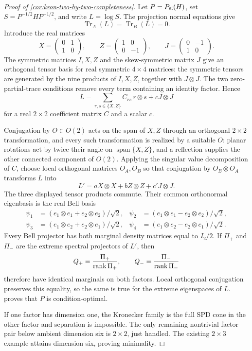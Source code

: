 \begin{proof}[Proof of \cref{cor:kron-two-by-two-completeness}]
Let \(P=P_{\mathcal K}(H)\), set \(S=P^{-1/2}HP^{-1/2}\), and write
\(L=\log S\).  The projection normal equations give
\[
  \operatorname{Tr}_A(L)=\operatorname{Tr}_B(L)=0.
\]
Introduce the real matrices
\[
  X=\begin{pmatrix}0&1\\1&0\end{pmatrix},
  \qquad
  Z=\begin{pmatrix}1&0\\0&-1\end{pmatrix},
  \qquad
  J=\begin{pmatrix}0&-1\\1&0\end{pmatrix}.
\]
The symmetric matrices \(I,X,Z\) and the skew-symmetric matrix \(J\) give an
orthogonal tensor basis for real symmetric \(4\times4\) matrices: the symmetric
tensors are generated by the nine products of \(I,X,Z\), together with
\(J\otimes J\).  The two zero-partial-trace conditions remove every term
containing an identity factor.  Hence
\[
  L
  =
  \sum_{r,s\in\{X,Z\}}C_{rs}\,r\otimes s+cJ\otimes J
\]
for a real \(2\times2\) coefficient matrix \(C\) and a scalar \(c\).

Conjugation by \(O\in O(2)\) acts on the span of \(X,Z\) through an
orthogonal \(2\times2\) transformation, and every such transformation is
realized by a suitable \(O\): planar rotations act by twice their angle on
\(\operatorname{span}\{X,Z\}\), and a reflection supplies the other connected
component of \(O(2)\).  Applying the singular value decomposition of
\(C\), choose local orthogonal matrices \(O_A,O_B\) so that conjugation by
\(O_B\otimes O_A\) transforms \(L\) into
\[
  L'=aX\otimes X+bZ\otimes Z+c'J\otimes J.
\]
The three displayed tensor products commute.  Their common orthonormal
eigenbasis is the real Bell basis
\[
\begin{aligned}
  \psi_1&=(e_1\otimes e_1+e_2\otimes e_2)/\sqrt2,&
  \psi_2&=(e_1\otimes e_1-e_2\otimes e_2)/\sqrt2,\\
  \psi_3&=(e_1\otimes e_2+e_2\otimes e_1)/\sqrt2,&
  \psi_4&=(e_1\otimes e_2-e_2\otimes e_1)/\sqrt2.
\end{aligned}
\]
Every Bell projector has both marginal density matrices equal to \(I_2/2\).
If \(\Pi_+\) and \(\Pi_-\) are the extreme spectral projectors of \(L'\),
then
\[
  Q_+=\frac{\Pi_+}{\operatorname{rank}\Pi_+},
  \qquad
  Q_-=\frac{\Pi_-}{\operatorname{rank}\Pi_-}
\]
therefore have identical marginals on both factors.  Local orthogonal
conjugation preserves this equality, so the same is true for the extreme
eigenspaces of \(L\).   proves that \(P\)
is condition-optimal.

If one factor has dimension one, the Kronecker family is the full SPD cone in
the other factor and separation is impossible.  The only remaining nontrivial
factor pair below ambient dimension six is \(2\times2\), just handled.  The
existing \(2\times3\) example attains dimension six, proving minimality.
\end{proof}

